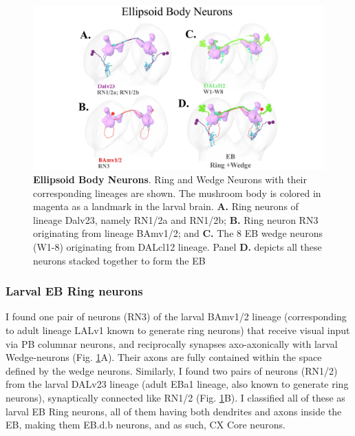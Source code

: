         \begin{figure}[H]
            \centering
            \includegraphics[width=12cm]{Figs/CX/EBneurons.pdf}
            \caption{\textbf{Ellipsoid Body Neurons}. Ring and Wedge Neurons with their corresponding lineages are shown. The mushroom body is colored in magenta as a landmark in the larval brain. \textbf{A.} Ring neurons of lineage Dalv23, namely RN1/2a and RN1/2b; \textbf{B.} Ring neuron RN3 originating from lineage BAmv1/2; and \textbf{C.} The 8 EB wedge neurons (W1-8) originating from DALcl12 lineage. Panel \textbf{D.} depicts all these neurons stacked together to form the EB}
            \label{EBneurons}
        \end{figure}

         \subsubsection{Larval EB Ring neurons}

            I found one pair of neurons (RN3) of the larval BAmv1/2 lineage (corresponding to adult lineage LALv1 known to generate ring neurons) that receive visual input via PB columnar neurons, and reciprocally synapses axo-axonically with larval Wedge-neurons (Fig. \ref{EBneurons}A).
            Their axons are fully contained within the space defined by the wedge neurons.
            Similarly, I found two pairs of neurons (RN1/2) from the larval DALv23 lineage (adult EBa1 lineage, also known to generate ring neurons), synaptically connected like RN1/2 (Fig. \ref{EBneurons}B). I classified all of these as larval EB Ring neurons, all of them having both dendrites and axons inside the EB, making them EB.d.b neurons, and as such, CX Core neurons. 


